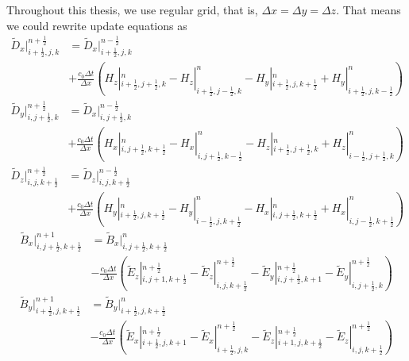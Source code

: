 Throughout this thesis, we use regular grid, that is, $\Delta x = \Delta y = \Delta z$. That means we could rewrite update equations as
\begin{equation}
  \begin{split}
    \widetilde{D}_x|_{i+\frac{1}{2},j,k}^{n+\frac{1}{2}} & = \widetilde{D}_x|_{i+\frac{1}{2},j,k}^{n-\frac{1}{2}}\\
    & + \frac{c_0\Delta t}{\Delta x}\left(H_z|_{i+\frac{1}{2},j+\frac{1}{2},k}^{n} - H_z|_{i+\frac{1}{2},j-\frac{1}{2},k}^{n} - H_y|_{i+\frac{1}{2},j,k+\frac{1}{2}}^{n} + H_y|_{i+\frac{1}{2},j,k-\frac{1}{2}}^{n}\right)
  \end{split}
\end{equation}
\begin{equation}
  \begin{split}
    \widetilde{D}_y|_{i,j+\frac{1}{2},k}^{n+\frac{1}{2}} & = \widetilde{D}_x|_{i,j+\frac{1}{2},k}^{n-\frac{1}{2}}\\
    & + \frac{c_0\Delta t}{\Delta x}\left(H_x|_{i,j+\frac{1}{2},k+\frac{1}{2}}^{n} - H_x|_{i,j+\frac{1}{2},k-\frac{1}{2}}^{n} - H_z|_{i+\frac{1}{2},j+\frac{1}{2},k}^{n} + H_z|_{i-\frac{1}{2},j+\frac{1}{2},k}^{n}\right)
  \end{split}
\end{equation}
\begin{equation}
  \begin{split}
    \widetilde{D}_z|_{i,j,k+\frac{1}{2}}^{n+\frac{1}{2}} & = \widetilde{D}_z|_{i,j,k+\frac{1}{2}}^{n-\frac{1}{2}}\\
    & + \frac{c_0\Delta t}{\Delta x}\left(H_y|_{i+\frac{1}{2},j,k+\frac{1}{2}}^{n} - H_y|_{i-\frac{1}{2},j,k+\frac{1}{2}}^{n} - H_x|_{i,j+\frac{1}{2},k+\frac{1}{2}}^{n} + H_x|_{i,j-\frac{1}{2},k+\frac{1}{2}}^{n}\right)
  \end{split}
\end{equation}
\begin{equation}
  \begin{split}
    \widetilde{B}_x|_{i,j+\frac{1}{2},k+\frac{1}{2}}^{n+1} & = \widetilde{B}_x|_{i,j+\frac{1}{2},k+\frac{1}{2}}^{n}\\
    & - \frac{c_0\Delta t}{\Delta x}\left(\widetilde{E}_z|_{i,j+1,k+\frac{1}{2}}^{n+\frac{1}{2}} - \widetilde{E}_z|_{i,j,k+\frac{1}{2}}^{n+\frac{1}{2}} - \widetilde{E}_y|_{i,j+\frac{1}{2},k+1}^{n+\frac{1}{2}} - \widetilde{E}_y|_{i,j+\frac{1}{2},k}^{n+\frac{1}{2}}\right)
  \end{split}
\end{equation}
\begin{equation}
  \begin{split}
    \widetilde{B}_y|_{i+\frac{1}{2},j,k+\frac{1}{2}}^{n+1} & = \widetilde{B}_y|_{i+\frac{1}{2},j,k+\frac{1}{2}}^{n}\\
    & - \frac{c_0\Delta t}{\Delta x}\left(\widetilde{E}_x|_{i+\frac{1}{2},j,k+1}^{n+\frac{1}{2}} - \widetilde{E}_x|_{i+\frac{1}{2},j,k}^{n+\frac{1}{2}} - \widetilde{E}_z|_{i+1,j,k+\frac{1}{2}}^{n+\frac{1}{2}} - \widetilde{E}_z|_{i,j,k+\frac{1}{2}}^{n+\frac{1}{2}}\right)
  \end{split}
\end{equation}
